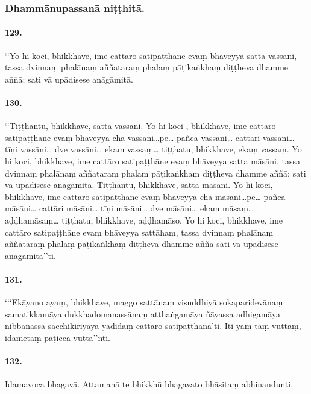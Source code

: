\subsubsection{Dhammānupassanā niṭṭhitā.}

\paragraph{129.} ‘‘Yo hi koci, bhikkhave, ime cattāro satipaṭṭhāne evaṃ bhāveyya satta vassāni, tassa dvinnaṃ phalānaṃ aññataraṃ phalaṃ pāṭikaṅkhaṃ diṭṭheva dhamme aññā; sati vā upādisese anāgāmitā.

\paragraph{130.} ‘‘Tiṭṭhantu, bhikkhave, satta vassāni. Yo hi koci , bhikkhave, ime cattāro satipaṭṭhāne evaṃ bhāveyya cha vassāni…pe… pañca vassāni… cattāri vassāni… tīṇi vassāni… dve vassāni… ekaṃ vassaṃ… tiṭṭhatu, bhikkhave, ekaṃ vassaṃ. Yo hi koci, bhikkhave, ime cattāro satipaṭṭhāne evaṃ bhāveyya satta māsāni, tassa dvinnaṃ phalānaṃ aññataraṃ phalaṃ pāṭikaṅkhaṃ diṭṭheva dhamme aññā; sati vā upādisese anāgāmitā. Tiṭṭhantu, bhikkhave, satta māsāni. Yo hi koci, bhikkhave, ime cattāro satipaṭṭhāne evaṃ bhāveyya cha māsāni…pe… pañca māsāni… cattāri māsāni… tīṇi māsāni… dve māsāni… ekaṃ māsaṃ… aḍḍhamāsaṃ… tiṭṭhatu, bhikkhave, aḍḍhamāso. Yo hi koci, bhikkhave, ime cattāro satipaṭṭhāne evaṃ bhāveyya sattāhaṃ, tassa dvinnaṃ phalānaṃ aññataraṃ phalaṃ pāṭikaṅkhaṃ diṭṭheva dhamme aññā sati vā upādisese anāgāmitā’’ti.

\paragraph{131.} ‘‘‘Ekāyano ayaṃ, bhikkhave, maggo sattānaṃ visuddhiyā sokaparidevānaṃ samatikkamāya dukkhadomanassānaṃ atthaṅgamāya ñāyassa adhigamāya nibbānassa sacchikiriyāya yadidaṃ cattāro satipaṭṭhānā’ti. Iti yaṃ taṃ vuttaṃ, idametaṃ paṭicca vutta’’nti.

\paragraph{132.} Idamavoca bhagavā. Attamanā te bhikkhū bhagavato bhāsitaṃ abhinandunti.



